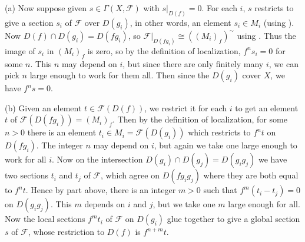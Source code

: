 {(a) Now suppose given $s\in\Gamma(X,\mathcal F)$ with $s|_{D(f)}=0$. For each $i$, $s$ restricts to give a section $s_i$ of $\mathcal F$ over $D(g_i)$, in other words, an element $s_i\in M_i$ (using ). Now $D(f)\cap D(g_i)=D(fg_i)$, so $\mathcal F|_{D(fg_i)}\cong((M_i)_f)^\sim$ using . Thus the image of $s_i$ in $(M_i)_f$ is zero, so by the definition of localization, $f^ns_i=0$ for some $n$. This $n$ may depend on $i$, but since there are only finitely many $i$, we can pick $n$ large enough to work for them all. Then since the $D(g_i)$ cover $X$, we have $f^ns=0$.

(b) Given an element $t\in\mathcal F(D(f))$, we restrict it for each $i$ to get an element $t$ of $\mathcal F(D(fg_i))=(M_i)_f$. Then by the definition of localization, for some $n>0$ there is an element $t_i\in M_i=\mathcal F(D(g_i))$ which restricts to $f^nt$ on $D(fg_i)$. The integer $n$ may depend on $i$, but again we take one large enough to work for all $i$. Now on the intersection $D(g_i)\cap D(g_j)=D(g_ig_j)$ we have two sections $t_i$ and $t_j$ of $\mathcal F$, which agree on $D(fg_ig_j)$ where they are both equal to $f^nt$. Hence by part  above, there is an integer $m>0$ such that $f^m(t_i-t_j)=0$ on $D(g_ig_j)$. This $m$ depends on $i$ and $j$, but we take one $m$ large enough for all. Now the local sections $f^mt_i$ of $\mathcal F$ on $D(g_i)$ glue together to give a global section $s$ of $\mathcal F$, whose restriction to $D(f)$ is $f^{n+m}t$.
}
